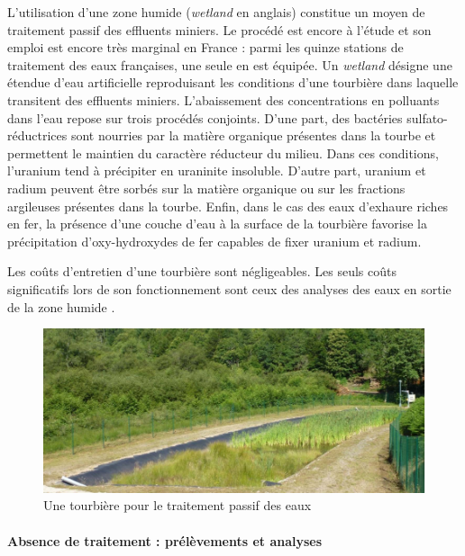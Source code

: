 \documentclass{article}
\begin{document}
L’utilisation d’une zone humide (\textit{wetland} en anglais) constitue un moyen de traitement passif des effluents miniers. Le procédé est encore à l’étude et son emploi est encore très marginal en France : parmi les quinze stations de traitement des eaux françaises, une seule en est équipée. Un \textit{wetland} désigne une étendue d’eau artificielle reproduisant les conditions d’une tourbière dans laquelle transitent des effluents miniers. L’abaissement des concentrations en polluants dans l’eau repose sur trois procédés conjoints. D’une part, des bactéries sulfato-réductrices sont nourries par la matière organique présentes dans la tourbe et permettent le maintien du caractère réducteur du milieu. Dans ces conditions, l’uranium tend à précipiter en uraninite insoluble. D’autre part, uranium et radium peuvent être sorbés sur la matière organique ou sur les fractions argileuses présentes dans la tourbe. Enfin, dans le cas des eaux d’exhaure riches en fer, la présence d’une couche d’eau à la surface de la tourbière favorise la précipitation d’oxy-hydroxydes de fer capables de fixer uranium et radium. 

Les coûts d’entretien d’une tourbière sont négligeables. Les seuls coûts significatifs lors de son fonctionnement sont ceux des analyses des eaux en sortie de la zone humide \cite{schick_informations_2020}.

\begin{figure}[H]
\centering
\includegraphics[width=0.7\linewidth]{III_A_4.png}
\caption{Une tourbière pour le traitement passif des eaux}
\label{fig:tourbiere}
\end{figure}


\paragraph{Absence de traitement : prélèvements et analyses \\ \\}
\end{document}
